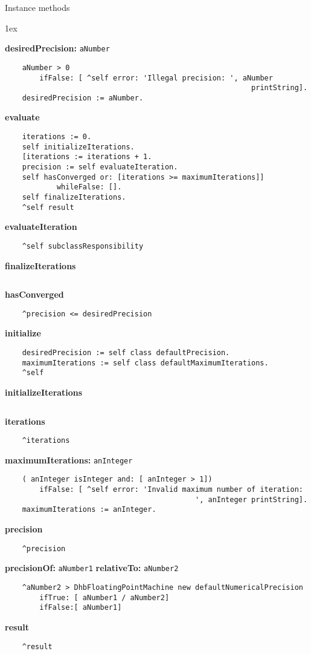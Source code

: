Instance methods
{\parskip 1ex\par\noindent}
{\bf desiredPrecision:} {\tt aNumber}
\begin{verbatim}
    aNumber > 0
        ifFalse: [ ^self error: 'Illegal precision: ', aNumber 
                                                         printString].
    desiredPrecision := aNumber.

\end{verbatim}
{\bf evaluate}
\begin{verbatim}
    iterations := 0.
    self initializeIterations.
    [iterations := iterations + 1.
    precision := self evaluateIteration.
    self hasConverged or: [iterations >= maximumIterations]] 
            whileFalse: [].
    self finalizeIterations.
    ^self result

\end{verbatim}
{\bf evaluateIteration}
\begin{verbatim}
    ^self subclassResponsibility

\end{verbatim}
{\bf finalizeIterations}
\begin{verbatim}

\end{verbatim}
{\bf hasConverged}
\begin{verbatim}
    ^precision <= desiredPrecision

\end{verbatim}
{\bf initialize}
\begin{verbatim}
    desiredPrecision := self class defaultPrecision.
    maximumIterations := self class defaultMaximumIterations.
    ^self

\end{verbatim}
{\bf initializeIterations}
\begin{verbatim}

\end{verbatim}
{\bf iterations}
\begin{verbatim}
    ^iterations

\end{verbatim}
{\bf maximumIterations:} {\tt anInteger}
\begin{verbatim}
    ( anInteger isInteger and: [ anInteger > 1])
        ifFalse: [ ^self error: 'Invalid maximum number of iteration: 
                                            ', anInteger printString].
    maximumIterations := anInteger.

\end{verbatim}
{\bf precision}
\begin{verbatim}
    ^precision

\end{verbatim}
{\bf precisionOf:} {\tt aNumber1} {\bf relativeTo:} {\tt aNumber2}
\begin{verbatim}
    ^aNumber2 > DhbFloatingPointMachine new defaultNumericalPrecision
        ifTrue: [ aNumber1 / aNumber2]
        ifFalse:[ aNumber1]

\end{verbatim}
{\bf result}
\begin{verbatim}
    ^result

\end{verbatim}

